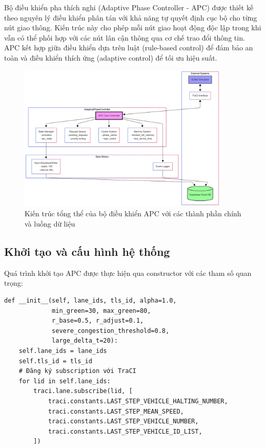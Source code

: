 \documentclass[12pt,a4paper,oneside]{report}
\begin{document}
Bộ điều khiển pha thích nghi (Adaptive Phase Controller - APC) được thiết kế theo nguyên lý điều khiển phân tán với khả năng tự quyết định cục bộ cho từng nút giao thông. Kiến trúc này cho phép mỗi nút giao hoạt động độc lập trong khi vẫn có thể phối hợp với các nút lân cận thông qua cơ chế trao đổi thông tin. APC kết hợp giữa điều khiển dựa trên luật (rule-based control) để đảm bảo an toàn và điều khiển thích ứng (adaptive control) để tối ưu hiệu suất.

\begin{figure}[H]
    \centering
    \includegraphics[width=0.9\textwidth]{Untitled diagram _ Mermaid Chart-2025-08-21-074754.png}
    \caption{Kiến trúc tổng thể của bộ điều khiển APC với các thành phần chính và luồng dữ liệu}
    \label{fig:apc_architecture}
\end{figure}

\subsection{Khởi tạo và cấu hình hệ thống}

Quá trình khởi tạo APC được thực hiện qua constructor với các tham số quan trọng:

\begin{lstlisting}[style=py, caption={Khởi tạo AdaptivePhaseController}]
def __init__(self, lane_ids, tls_id, alpha=1.0, 
             min_green=30, max_green=80,
             r_base=0.5, r_adjust=0.1, 
             severe_congestion_threshold=0.8,
             large_delta_t=20):
    self.lane_ids = lane_ids
    self.tls_id = tls_id
    # Đăng ký subscription với TraCI
    for lid in self.lane_ids:
        traci.lane.subscribe(lid, [
            traci.constants.LAST_STEP_VEHICLE_HALTING_NUMBER,
            traci.constants.LAST_STEP_MEAN_SPEED,
            traci.constants.LAST_STEP_VEHICLE_NUMBER,
            traci.constants.LAST_STEP_VEHICLE_ID_LIST,
        ])
\end{lstlisting}
\end{document}
